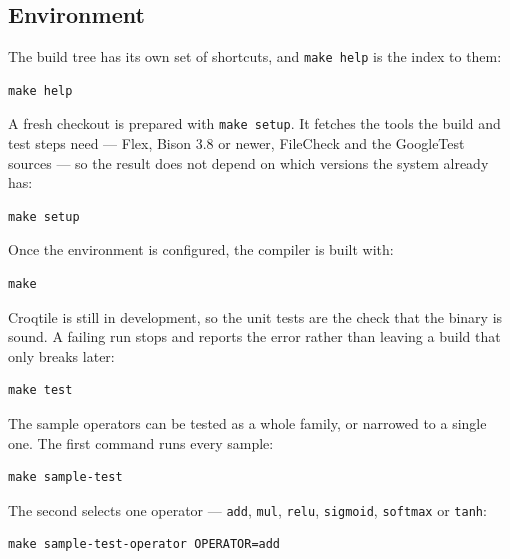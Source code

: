 \subsection*{Environment}

The build tree has its own set of shortcuts, and \texttt{make help} is the index to them:

\begin{lstlisting}[language={},caption={Listing Makefile targets}]
make help
\end{lstlisting}

A fresh checkout is prepared with \texttt{make setup}. It fetches the tools the build and test steps need --- Flex, Bison 3.8 or newer, FileCheck and the GoogleTest sources --- so the result does not depend on which versions the system already has:

\begin{lstlisting}[language={},caption={Preparing a fresh checkout}]
make setup
\end{lstlisting}

Once the environment is configured, the compiler is built with:

\begin{lstlisting}[language={},caption={Building the configured tree}]
make
\end{lstlisting}

Croqtile is still in development, so the unit tests are the check that the binary is sound. A failing run stops and reports the error rather than leaving a build that only breaks later:

\begin{lstlisting}[language={},caption={Running the unit tests}]
make test
\end{lstlisting}

The sample operators can be tested as a whole family, or narrowed to a single one. The first command runs every sample:

\begin{lstlisting}[language={},caption={All sample operator tests}]
make sample-test
\end{lstlisting}

The second selects one operator --- \texttt{add}, \texttt{mul}, \texttt{relu}, \texttt{sigmoid}, \texttt{softmax} or \texttt{tanh}:

\begin{lstlisting}[language={},caption={One sample operator}]
make sample-test-operator OPERATOR=add
\end{lstlisting}

